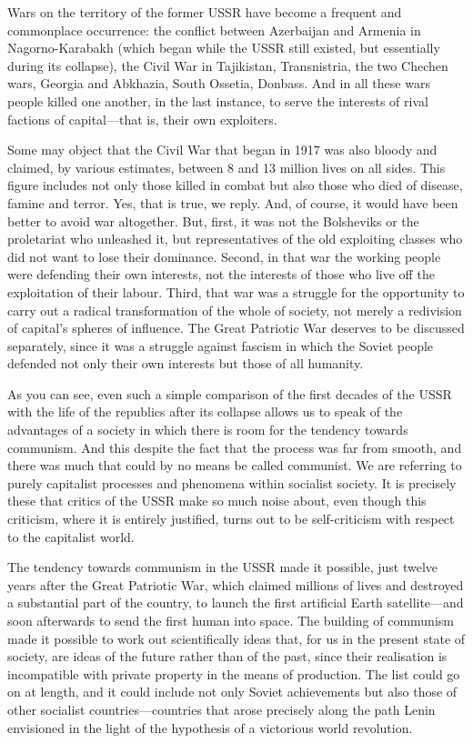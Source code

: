\documentclass[12pt,a4paper,openany]{book}
\begin{document}
Wars on the territory of the former USSR have become a frequent and commonplace occurrence: the conflict between Azerbaijan and Armenia in Nagorno-Karabakh (which began while the USSR still existed, but essentially during its collapse), the Civil War in Tajikistan, Transnistria, the two Chechen wars, Georgia and Abkhazia, South Ossetia, Donbass. And in all these wars people killed one another, in the last instance, to serve the interests of rival factions of capital—that is, their own exploiters.

Some may object that the Civil War that began in 1917 was also bloody and claimed, by various estimates, between 8 and 13 million lives on all sides. This figure includes not only those killed in combat but also those who died of disease, famine and terror. Yes, that is true, we reply. And, of course, it would have been better to avoid war altogether. But, first, it was not the Bolsheviks or the proletariat who unleashed it, but representatives of the old exploiting classes who did not want to lose their dominance. Second, in that war the working people were defending their own interests, not the interests of those who live off the exploitation of their labour. Third, that war was a struggle for the opportunity to carry out a radical transformation of the whole of society, not merely a redivision of capital’s spheres of influence. The Great Patriotic War deserves to be discussed separately, since it was a struggle against fascism in which the Soviet people defended not only their own interests but those of all humanity.

As you can see, even such a simple comparison of the first decades of the USSR with the life of the republics after its collapse allows us to speak of the advantages of a society in which there is room for the tendency towards communism. And this despite the fact that the process was far from smooth, and there was much that could by no means be called communist. We are referring to purely capitalist processes and phenomena within socialist society. It is precisely these that critics of the USSR make so much noise about, even though this criticism, where it is entirely justified, turns out to be self-criticism with respect to the capitalist world.

The tendency towards communism in the USSR made it possible, just twelve years after the Great Patriotic War, which claimed millions of lives and destroyed a substantial part of the country, to launch the first artificial Earth satellite—and soon afterwards to send the first human into space. The building of communism made it possible to work out scientifically ideas that, for us in the present state of society, are ideas of the future rather than of the past, since their realisation is incompatible with private property in the means of production. The list could go on at length, and it could include not only Soviet achievements but also those of other socialist countries—countries that arose precisely along the path Lenin envisioned in the light of the hypothesis of a victorious world revolution.
\end{document}
